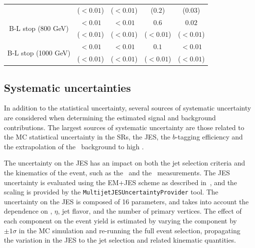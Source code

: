 \begin{table}
{\begin{tabular}{c|cccc}
                                             & ($< 0.01$)                         & ($<0.01$)                          & ($0.2$)                          & ($0.03$) \vspace{1ex} \\
      \multirow{2}{*}{B-L stop (800 GeV)}    & $< 0.01$                           & $< 0.01$                           & $0.6$                            & $0.02$   \\
                                             & ($< 0.01$)                         & ($< 0.01$)                         & ($< 0.01$)                       & ($< 0.01$) \vspace{1ex} \\
      \multirow{2}{*}{B-L stop (1000 GeV)}   & $< 0.01$                           & $< 0.01$                           & $0.1$                            & $< 0.01$                     \\
                                             & ($< 0.01$)                         & ($< 0.01$)                         & ($< 0.01$)                       & ($< 0.01$)
      \vspace{1ex} \\
      \bottomrule
    \end{tabular}

  }
\end{table}

\subsection{Systematic uncertainties}
\label{sec:systematics}

In addition to the statistical uncertainty, several sources of systematic
uncertainty are considered when determining the estimated signal and background
contributions.
The largest sources of systematic uncertainty are those related to the
MC statistical uncertainty in the SRs, the JES, the $b$-tagging efficiency
and the extrapolation of the \ZGAMMAJETS\ background to high \HT. 

The uncertainty on the JES has an impact on both the jet selection criteria
and the kinematics of the event, such as the \HT\ and the \MET\ measurements.
The JES uncertainty is evaluated using the EM+JES scheme as described
in~\cite{JES}, and the scaling is provided by the
\texttt{MultijetJESUncertaintyProvider} tool.
The uncertainty on the JES is composed of 16 parameters, and takes into account
the dependence on \pt, $\eta$, jet flavor, and the number of primary vertices.
The effect of each component on the event yield is estimated by varying the
component by $\pm 1 \sigma$ in the MC simulation and re-running the full event
selection, propagating the variation in the JES to the jet selection and related
kinematic quantities.

